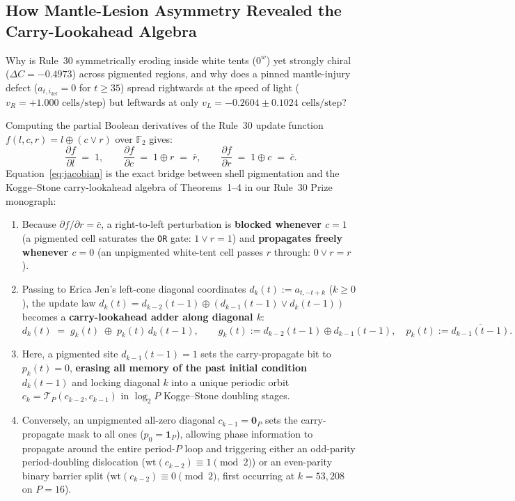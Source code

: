 \documentclass[11pt,a4paper]{article}
\theoremstyle{definition}
\theoremstyle{remark}
\newcommand{\Ftwo}{\mathbb{F}_2}
\begin{document}
\subsection{How Mantle-Lesion Asymmetry Revealed the Carry-Lookahead Algebra}

Why is Rule~30 symmetrically eroding inside white tents ($0^w$) yet strongly chiral ($\Delta C = -0.4973$) across pigmented regions, and why does a pinned mantle-injury defect ($a_{t, i_{\mathrm{def}}} = 0$ for $t \ge 35$) spread rightwards at the speed of light ($v_R = +1.000\text{ cells/step}$) but leftwards at only $v_L = -0.2604 \pm 0.1024\text{ cells/step}$?

Computing the partial Boolean derivatives of the Rule~30 update function $f(l, c, r) = l \oplus (c \lor r)$ over $\Ftwo$ gives:
\begin{equation}\label{eq:jacobian}
  \frac{\partial f}{\partial l} \;=\; 1, \qquad
  \frac{\partial f}{\partial c} \;=\; 1 \oplus r \;=\; \bar{r}, \qquad
  \frac{\partial f}{\partial r} \;=\; 1 \oplus c \;=\; \bar{c}.
\end{equation}
Equation~\eqref{eq:jacobian} is the exact bridge between shell pigmentation and the Kogge--Stone carry-lookahead algebra of Theorems~1--4 in our Rule~30 Prize monograph:
\begin{enumerate}
  \item Because $\partial f / \partial r = \bar{c}$, a right-to-left perturbation is \textbf{blocked whenever $c = 1$} (a pigmented cell saturates the \texttt{OR} gate: $1 \lor r = 1$) and \textbf{propagates freely whenever $c = 0$} (an unpigmented white-tent cell passes $r$ through: $0 \lor r = r$).
  \item Passing to Erica Jen's left-cone diagonal coordinates $d_k(t) := a_{t,-t+k}$ ($k \ge 0$), the update law $d_k(t) = d_{k-2}(t-1) \oplus (d_{k-1}(t-1) \lor d_k(t-1))$ becomes a \textbf{carry-lookahead adder along diagonal $k$}:
  \begin{equation}\label{eq:carry_diag}
    d_k(t) \;=\; g_k(t) \;\oplus\; p_k(t)\,d_k(t-1), \qquad
    g_k(t) := d_{k-2}(t-1) \oplus d_{k-1}(t-1), \quad
    p_k(t) := \overline{d_{k-1}(t-1)}.
  \end{equation}
  \item Here, a pigmented site $d_{k-1}(t-1) = 1$ sets the carry-propagate bit to $p_k(t) = 0$, \textbf{erasing all memory of the past initial condition $d_k(t-1)$} and locking diagonal $k$ into a unique periodic orbit $c_k = \mathcal{T}_P(c_{k-2}, c_{k-1})$ in $\log_2 P$ Kogge--Stone doubling stages.
  \item Conversely, an unpigmented all-zero diagonal $c_{k-1} = \mathbf{0}_P$ sets the carry-propagate mask to all ones ($p_0 = \mathbf{1}_P$), allowing phase information to propagate around the entire period-$P$ loop and triggering either an odd-parity period-doubling dislocation ($\mathrm{wt}(c_{k-2}) \equiv 1 \pmod 2$) or an even-parity binary barrier split ($\mathrm{wt}(c_{k-2}) \equiv 0 \pmod 2$, first occurring at $k = 53{,}208$ on $P = 16$).
\end{enumerate}
\end{document}
